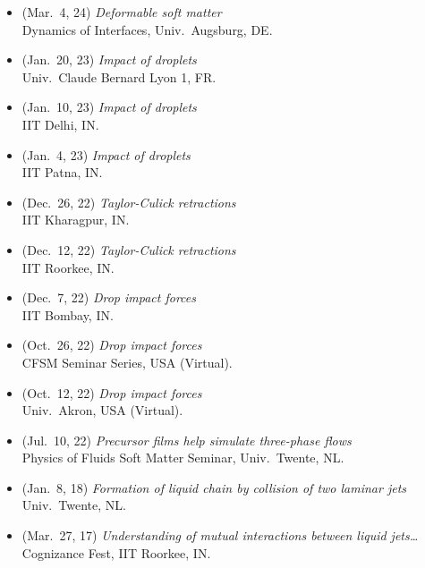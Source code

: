 \begin{itemize}[leftmargin=1.5em]
  Univ.~Edinburgh, UK.
\item[\textbullet] (Mar.~4, 24) \emph{Deformable soft matter} \\
  Dynamics of Interfaces, Univ.~Augsburg, DE.
\item[\textbullet] (Jan.~20, 23) \emph{Impact of droplets} \\
  Univ.~Claude Bernard Lyon 1, FR.
\item[\textbullet] (Jan.~10, 23) \emph{Impact of droplets} \\
  IIT Delhi, IN.
\item[\textbullet] (Jan.~4, 23) \emph{Impact of droplets} \\
  IIT Patna, IN.
\item[\textbullet] (Dec.~26, 22) \emph{Taylor-Culick retractions} \\
  IIT Kharagpur, IN.
\item[\textbullet] (Dec.~12, 22) \emph{Taylor-Culick retractions} \\
  IIT Roorkee, IN.
\item[\textbullet] (Dec.~7, 22) \emph{Drop impact forces} \\
  IIT Bombay, IN.
\item[\textbullet] (Oct.~26, 22) \emph{Drop impact forces} \\
  CFSM Seminar Series, USA (Virtual). \href{https://www.youtube.com/live/enTMAucwUDs?si=Dm-IJ3A0o7AhMc2T}{\color{red}\faYoutube}
\item[\textbullet] (Oct.~12, 22) \emph{Drop impact forces} \\
  Univ.~Akron, USA (Virtual).
\item[\textbullet] (Jul.~10, 22) \emph{Precursor films help simulate three-phase flows} \\
  Physics of Fluids Soft Matter Seminar, Univ.~Twente, NL. \href{https://youtu.be/ozrnYe8u1HA?si=DA4JIFjNozmPsQuE}{\color{red}\faYoutube}
\item[\textbullet] (Jan.~8, 18) \emph{Formation of liquid chain by collision of two laminar jets} \\
  Univ.~Twente, NL.
\item[\textbullet] (Mar.~27, 17) \emph{Understanding of mutual interactions between liquid jets\ldots} \\
  Cognizance Fest, IIT Roorkee, IN.
\end{itemize}


